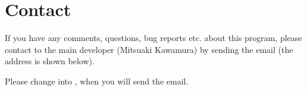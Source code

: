 \documentclass[letterpaper,10pt,dvipdfmx,openany,english]{sphinxmanual}
\begin{document}
\chapter{Contact}
\label{\detokenize{shiftk_contact_en:contact}}\label{\detokenize{shiftk_contact_en::doc}}
If you have any comments, questions, bug reports etc. about this program,
please contact to the main developer (Mitsuaki Kawamura) by
sending the e\sphinxhyphen{}mail (the address is shown below).

\begin{sphinxVerbatim}[commandchars=\\\{\}]
\end{sphinxVerbatim}

Please change  into , when you will send the e\sphinxhyphen{}mail.



\renewcommand{\indexname}{Index}
\printindex
\end{document}
